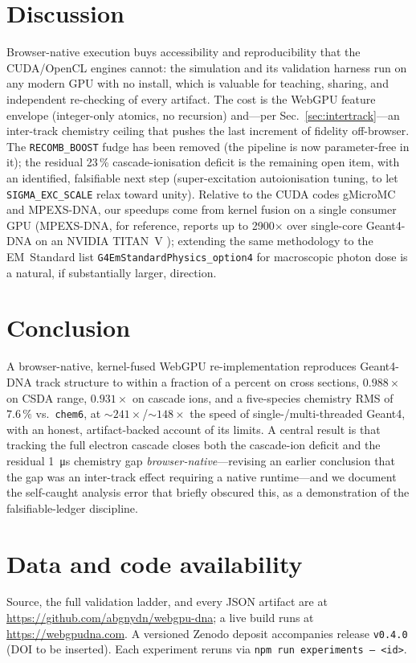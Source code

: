 \documentclass[11pt]{article}
\begin{document}
\section{Discussion}
\label{sec:discussion}
Browser-native execution buys accessibility and reproducibility that the
CUDA/OpenCL engines cannot: the simulation and its validation harness run on
any modern GPU with no install, which is valuable for teaching, sharing, and
independent re-checking of every artifact. The cost is the WebGPU feature
envelope (integer-only atomics, no recursion) and---per
Sec.~\ref{sec:intertrack}---an inter-track chemistry ceiling that pushes the
last increment of fidelity off-browser. The \texttt{RECOMB\_BOOST} fudge has
been removed (the pipeline is now parameter-free in it); the residual 23\,\%
cascade-ionisation deficit is the remaining open item, with an identified,
falsifiable next step (super-excitation autoionisation tuning, to let
\texttt{SIGMA\_EXC\_SCALE} relax toward unity). Relative to the CUDA codes gMicroMC and
MPEXS-DNA, our speedups come from
kernel fusion on a single consumer GPU (MPEXS-DNA, for reference, reports up
to 2900$\times$ over single-core Geant4-DNA on an NVIDIA TITAN~V
\cite{okada2019mpexs}); extending the same methodology to the
EM~Standard list \texttt{G4EmStandardPhysics\_option4} for macroscopic photon
dose is a natural, if substantially larger, direction.

\section{Conclusion}
A browser-native, kernel-fused WebGPU re-implementation reproduces Geant4-DNA
track structure to within a fraction of a percent on cross sections,
$0.988\times$ on CSDA range, $0.931\times$ on cascade ions, and a five-species
chemistry RMS of $7.6\,\%$ vs.\ \texttt{chem6}, at ${\sim}241\times$/${\sim}148\times$ the
speed of single-/multi-threaded Geant4, with an honest, artifact-backed account
of its limits. A central result is that tracking the full electron cascade
closes both the cascade-ion deficit and the residual \SI{1}{\micro s} chemistry
gap \emph{browser-native}---revising an earlier conclusion that the gap was an
inter-track effect requiring a native runtime---and we document the self-caught
analysis error that briefly obscured this, as a demonstration of the
falsifiable-ledger discipline.

\section*{Data and code availability}
Source, the full validation ladder, and every JSON artifact are at
\url{https://github.com/abgnydn/webgpu-dna}; a live build runs at
\url{https://webgpudna.com}. A versioned Zenodo deposit accompanies release
\texttt{v0.4.0} (DOI to be inserted). Each experiment reruns via
\texttt{npm run experiments -- <id>}.



\end{document}
